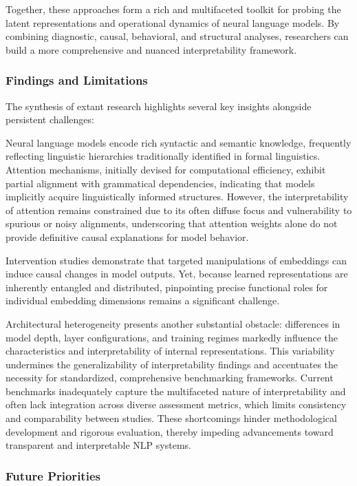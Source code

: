 \documentclass[sigconf]{acmart}
\begin{document}
Together, these approaches form a rich and multifaceted toolkit for probing the latent representations and operational dynamics of neural language models. By combining diagnostic, causal, behavioral, and structural analyses, researchers can build a more comprehensive and nuanced interpretability framework.

\subsubsection{Findings and Limitations}

The synthesis of extant research highlights several key insights alongside persistent challenges:

Neural language models encode rich syntactic and semantic knowledge, frequently reflecting linguistic hierarchies traditionally identified in formal linguistics. Attention mechanisms, initially devised for computational efficiency, exhibit partial alignment with grammatical dependencies, indicating that models implicitly acquire linguistically informed structures. However, the interpretability of attention remains constrained due to its often diffuse focus and vulnerability to spurious or noisy alignments, underscoring that attention weights alone do not provide definitive causal explanations for model behavior.

Intervention studies demonstrate that targeted manipulations of embeddings can induce causal changes in model outputs. Yet, because learned representations are inherently entangled and distributed, pinpointing precise functional roles for individual embedding dimensions remains a significant challenge.

Architectural heterogeneity presents another substantial obstacle: differences in model depth, layer configurations, and training regimes markedly influence the characteristics and interpretability of internal representations. This variability undermines the generalizability of interpretability findings and accentuates the necessity for standardized, comprehensive benchmarking frameworks. Current benchmarks inadequately capture the multifaceted nature of interpretability and often lack integration across diverse assessment metrics, which limits consistency and comparability between studies. These shortcomings hinder methodological development and rigorous evaluation, thereby impeding advancements toward transparent and interpretable NLP systems.

\subsubsection{Future Priorities}
\end{document}
